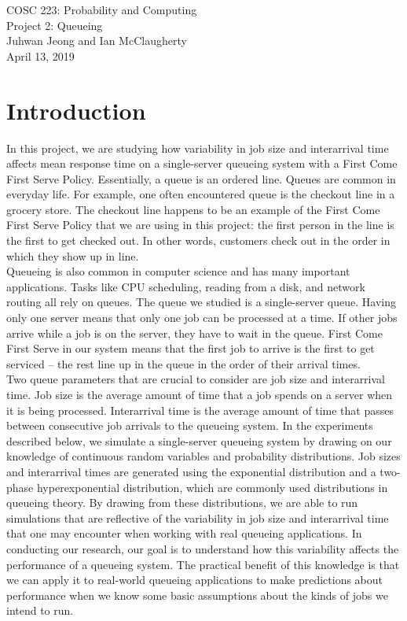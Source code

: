 \documentclass[12pt]{article}
\begin{document}
\begin{center}
\Large{COSC 223: Probability and Computing} \\
\Large{Project 2: Queueing} \\ 
\large{Juhwan Jeong and Ian McClaugherty} \\
\large{April 13, 2019}
\end{center}

\section{Introduction}
In this project, we are studying how variability in job size and interarrival time affects mean response time on a single-server queueing system with a First Come First Serve Policy. Essentially, a queue is an ordered line. Queues are common in everyday life. For example, one often encountered queue is the checkout line in a grocery store. The checkout line happens to be an example of the First Come First Serve Policy that we are using in this project: the first person in the line is the first to get checked out. In other words, customers check out in the order in which they show up in line.  \\ 

Queueing is also common in computer science and has many important applications. Tasks like CPU scheduling, reading from a disk, and network routing all rely on queues. The queue we studied is a single-server queue. Having only one server means that only one job can be processed at a time. If other jobs arrive while a job is on the server, they have to wait in the queue. First Come First Serve in our system means that the first job to arrive is the first to get serviced -- the rest line up in the queue in the order of their arrival times. \\

Two queue parameters that are crucial to consider are job size and interarrival time.  Job size is the average amount of time that a job spends on a server when it is being processed. Interarrival time is the average amount of time that passes between consecutive job arrivals to the queueing system. In the experiments described below, we simulate a single-server queueing system by drawing on our knowledge of continuous random variables and  probability distributions. Job sizes and interarrival times are generated using the exponential distribution and a two-phase hyperexponential distribution, which are commonly used distributions in queueing theory. By drawing from these distributions, we are able to run simulations that are reflective of the variability in job size and interarrival time that one may encounter when working with real queueing applications. In conducting our research, our goal is to understand how this variability affects the performance of a queueing system. The practical benefit of this knowledge is that we can apply it to real-world queueing applications to make predictions about performance when we know some basic assumptions about the kinds of jobs we intend to run. 
\end{document}
